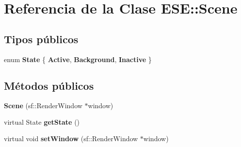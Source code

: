 \hypertarget{class_e_s_e_1_1_scene}{\section{Referencia de la Clase E\-S\-E\-:\-:Scene}
\label{class_e_s_e_1_1_scene}
}
\subsection*{Tipos públicos}
\begin{DoxyCompactItemize}
\item 
enum {\bfseries State} \{ {\bfseries Active}, 
{\bfseries Background}, 
{\bfseries Inactive}
 \}
\end{DoxyCompactItemize}
\subsection*{Métodos públicos}
\begin{DoxyCompactItemize}
\item 
\hypertarget{class_e_s_e_1_1_scene_a93bf19aa1d39de6681720062849424ec}{{\bfseries Scene} (sf\-::\-Render\-Window $\ast$window)}\label{class_e_s_e_1_1_scene_a93bf19aa1d39de6681720062849424ec}

\item 
\hypertarget{class_e_s_e_1_1_scene_abdb55959ba27e7bef73ab2cc4cb14bb9}{virtual State {\bfseries get\-State} ()}\label{class_e_s_e_1_1_scene_abdb55959ba27e7bef73ab2cc4cb14bb9}

\item 
\hypertarget{class_e_s_e_1_1_scene_ac4c38efa12cce119b3553a4e07c1db88}{virtual void {\bfseries set\-Window} (sf\-::\-Render\-Window $\ast$window)}\label{class_e_s_e_1_1_scene_ac4c38efa12cce119b3553a4e07c1db88}

\end{DoxyCompactItemize}
